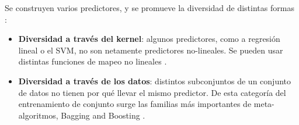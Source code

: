 \documentclass{beamer}
\begin{document}
{Se construyen varios predictores, y se promueve la diversidad de distintas formas \cite{ye2012empirical}:

\begin{itemize}
	\item \textbf{Diversidad a través del kernel}: algunos predictores, como a regresión lineal o el SVM, no son netamente predictores no-lineales. Se pueden usar distintas funciones de mapeo no lineales \cite{theodoridis2009pattern}. %
	
	\item \textbf{Diversidad a través de los datos}: distintos subconjuntos de un conjunto de datos no tienen por qué llevar el mismo predictor. De esta categoría del entrenamiento de conjunto surge las familias más importantes de meta-algoritmos, Bagging \cite{Bbeiman1996} and Boosting \cite{Freund1999}. %
	

\end{itemize}}
\end{document}
